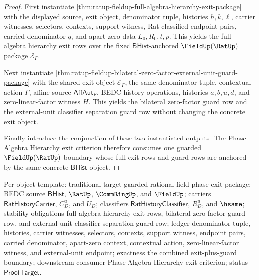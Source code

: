 \begin{proof}
First instantiate
\autoref{thm:ratup-fieldup-full-algebra-hierarchy-exit-package} with the
displayed source, exit object, denominator tuple, histories $h,k,\ell$, carrier
witnesses, selectors, contexts, support witness, Rat-classified endpoint pairs,
carried denominator $q$, and apart-zero data $L_0,R_0,t,p$. This yields the full
algebra hierarchy exit rows over the fixed
$\mathsf{BHist}$-anchored $\FieldUp(\RatUp)$ package $\mathcal E_F$.

Next instantiate
\autoref{thm:ratup-fieldup-bilateral-zero-factor-external-unit-guard-package}
with the shared exit object $\mathcal E_F$, the same denominator tuple,
contextual action $\Gamma$, affine source $\mathsf{AffAut}_F$, BEDC history
operations, histories $a,b,u,d$, and zero-linear-factor witness $H$. This yields
the bilateral zero-factor guard row and the external-unit classifier separation
guard row without changing the concrete exit object.

Finally introduce the conjunction of these two instantiated outputs. The Phase
Algebra Hierarchy exit criterion therefore consumes one guarded
$\FieldUp(\RatUp)$ boundary whose full-exit rows and guard rows are anchored by
the same concrete $\mathsf{BHist}$ object.
\end{proof}

Per-object template: traditional target guarded rational field phase-exit
package; BEDC source $\mathsf{BHist}$, $\RatUp$, $\CommRingUp$, and
$\FieldUp$; carriers $\mathsf{RatHistoryCarrier}$, $C_D^u$, and $U_D$;
classifiers $\mathsf{RatHistoryClassifier}$, $R_D^u$, and $\hsame$; stability
obligations full algebra hierarchy exit rows, bilateral
zero-factor guard row, and external-unit classifier separation guard row;
ledger denominator tuple, histories, carrier witnesses, selectors, contexts,
support witness, endpoint pairs, carried denominator, apart-zero context,
contextual action, zero-linear-factor witness, and external-unit endpoint;
exactness the combined exit-plus-guard boundary;
downstream consumer Phase Algebra Hierarchy exit criterion; status
$\mathsf{ProofTarget}$.

